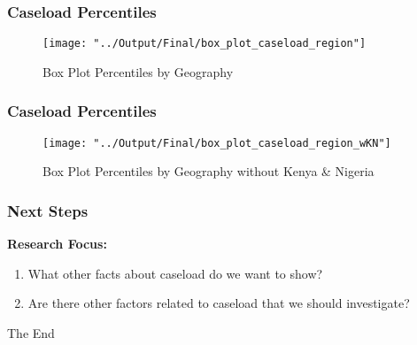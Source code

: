\documentclass{beamer}
\begin{document}
	
	\begin{frame}
		\frametitle{Caseload Percentiles}
		\begin{figure}[H] 
			\centering
			\caption{Box Plot Percentiles by Geography} 
			\texttt{[image: "../Output/Final/box\_plot\_caseload\_region"]}
		\end{figure}
	\end{frame}

	
		\begin{frame}
		\frametitle{Caseload Percentiles}
			\begin{figure}[H] 
				\centering
				\caption{Box Plot Percentiles by Geography without Kenya \& Nigeria } 
				\texttt{[image: "../Output/Final/box\_plot\_caseload\_region\_wKN"]}
			\end{figure}
	\end{frame}

	
	
	\begin{frame}
		\frametitle{Next Steps}
			\textbf{Research Focus:}
					\begin{enumerate}
						\item What other facts about caseload do we want to show?
						\item Are there other factors related to caseload that we should investigate?
					\end{enumerate}
	\end{frame}
	
	
	\begin{frame}
		\Huge{\centerline{The End}}
	\end{frame}
	
	
\end{document}
